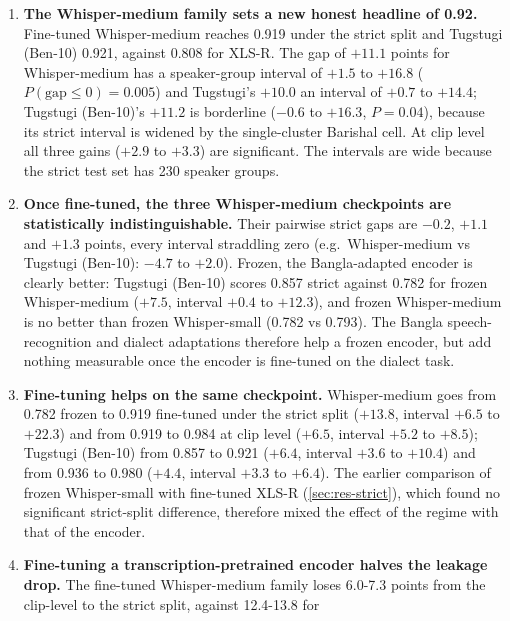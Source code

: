 \begin{enumerate}
  \item \textbf{The Whisper-medium family sets a new honest headline of
        0.92.} Fine-tuned Whisper-medium reaches 0.919 under the strict split
        and Tugstugi (Ben-10) 0.921, against 0.808 for XLS-R. The gap of
        $+11.1$ points for Whisper-medium has a speaker-group interval of
        $+1.5$ to $+16.8$ ($P(\text{gap} \le 0) = 0.005$) and Tugstugi's
        $+10.0$ an interval of $+0.7$ to $+14.4$; Tugstugi (Ben-10)'s $+11.2$
        is borderline ($-0.6$ to $+16.3$, $P = 0.04$), because its strict
        interval is widened by the single-cluster Barishal cell. At clip level
        all three gains ($+2.9$ to $+3.3$) are significant. The intervals are
        wide because the strict test set has 230 speaker groups.
  \item \textbf{Once fine-tuned, the three Whisper-medium checkpoints are
        statistically indistinguishable.} Their pairwise strict gaps are
        $-0.2$, $+1.1$ and $+1.3$ points, every interval straddling zero (e.g.\
        Whisper-medium vs Tugstugi (Ben-10): $-4.7$ to $+2.0$). Frozen, the
        Bangla-adapted encoder is clearly better: Tugstugi (Ben-10) scores
        0.857 strict against 0.782 for frozen Whisper-medium ($+7.5$, interval
        $+0.4$ to $+12.3$), and frozen Whisper-medium is no better than frozen
        Whisper-small (0.782 vs 0.793). The Bangla speech-recognition and
        dialect adaptations therefore help a frozen encoder, but add nothing
        measurable once the encoder is fine-tuned on the dialect task.
  \item \textbf{Fine-tuning helps on the same checkpoint.} Whisper-medium
        goes from 0.782 frozen to 0.919 fine-tuned under the strict split
        ($+13.8$, interval $+6.5$ to $+22.3$) and from 0.919 to 0.984 at clip
        level ($+6.5$, interval $+5.2$ to $+8.5$); Tugstugi (Ben-10) from 0.857
        to 0.921 ($+6.4$, interval $+3.6$ to $+10.4$) and from 0.936 to 0.980
        ($+4.4$, interval $+3.3$ to $+6.4$). The earlier comparison of frozen
        Whisper-small with fine-tuned XLS-R (\cref{sec:res-strict}), which found
        no significant strict-split difference, therefore mixed the effect of
        the regime with that of the encoder.
  \item \textbf{Fine-tuning a transcription-pretrained encoder halves the
        leakage drop.} The fine-tuned Whisper-medium family loses 6.0-7.3
        points from the clip-level to the strict split, against 12.4-13.8 for

\end{enumerate}
